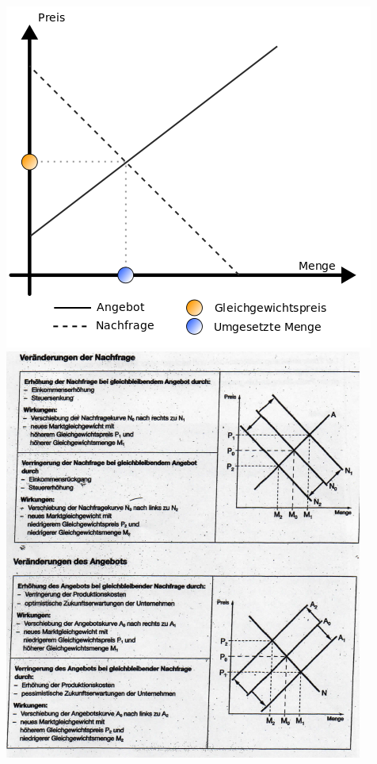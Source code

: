 \includegraphics[scale=0.7]{pictures/lf01-pic/lf01-gleichgewichtspreis.png}\\
\includegraphics[scale=1.0]{pictures/lf01-pic/lf01-nachfrageverschiebung.png}

